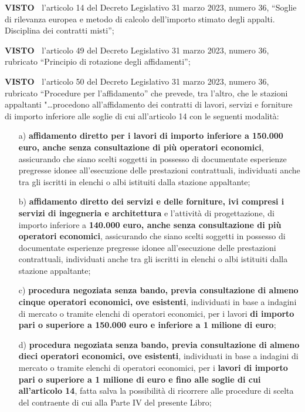 \documentclass[a4paper,12pt]{letter}
\begin{document}
\textbf{VISTO~}                   l’articolo 14 del Decreto Legislativo
31 marzo 2023, numero 36, ``Soglie di rilevanza    europea e metodo di
calcolo dell’importo stimato degli appalti. Disciplina dei contratti
misti''; 

\textbf{VISTO~}	l’articolo 49 del Decreto Legislativo 31 marzo 2023,
numero 36, rubricato ``Principio di rotazione degli affidamenti'';


\textbf{VISTO~}	l’articolo 50 del Decreto Legislativo 31 marzo 2023,
numero 36, rubricato ``Procedure per l’affidamento'' che prevede,
tra l’altro, che le stazioni appaltanti "…procedono all'affidamento
dei contratti di lavori, servizi e forniture di importo inferiore alle
soglie di cui all'articolo 14 con le seguenti modalità:


\begin{enumerate}

\item[a)]  \textbf{affidamento diretto per i lavori di importo inferiore a 150.000
euro, anche senza consultazione di più operatori economici}, assicurando
che siano scelti soggetti in possesso di documentate esperienze pregresse
idonee all'esecuzione delle prestazioni contrattuali, individuati anche
tra gli iscritti in elenchi o albi istituiti dalla stazione appaltante;

\item[b)]  \textbf{affidamento diretto dei servizi e delle forniture, ivi compresi
i servizi di ingegneria e architettura} e l'attività di progettazione,
di importo inferiore a \textbf{140.000 euro, anche senza consultazione di più
operatori economici}, assicurando che siano scelti soggetti in possesso di
documentate esperienze pregresse idonee all'esecuzione delle prestazioni
contrattuali, individuati anche tra gli iscritti in elenchi o albi
istituiti dalla stazione appaltante;

\item[c)] \textbf{procedura negoziata senza bando, previa consultazione di almeno
cinque operatori economici, ove esistenti}, individuati in base a indagini
di mercato o tramite elenchi di operatori economici, per i lavori \textbf{di
importo pari o superiore a 150.000 euro e inferiore a 1 milione di euro};

\item[d)] \textbf{procedura negoziata senza bando, previa consultazione di almeno
dieci operatori economici, ove esistenti}, individuati in base a indagini
di mercato o tramite elenchi di operatori economici, per i \textbf{lavori di
importo pari o superiore a 1 milione di euro e fino alle soglie di cui
all'articolo 14}, fatta salva la possibilità di ricorrere alle procedure
di scelta del contraente di cui alla Parte IV del presente Libro;


\end{enumerate}
\end{document}
